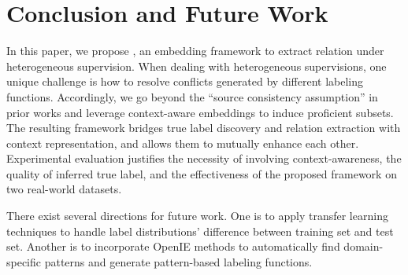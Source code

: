 \section{Conclusion and Future Work}
\label{sect:conclusion}



In this paper, we propose \our, an embedding framework to extract relation under heterogeneous supervision. 
When dealing with heterogeneous supervisions, one unique challenge is how to resolve conflicts generated by different labeling functions. 
Accordingly, we go beyond the ``source consistency assumption'' in prior works and leverage context-aware embeddings to induce proficient subsets.
The resulting framework bridges true label discovery and relation extraction with context representation, and allows them to mutually enhance each other. 
Experimental evaluation justifies the necessity of involving context-awareness, the quality of inferred true label, and the effectiveness of the proposed framework on two real-world datasets.

There exist several directions for future work. 
One is to apply transfer learning techniques to handle label distributions' difference between training set and test set. 
Another is to incorporate OpenIE methods to automatically find domain-specific patterns and generate pattern-based labeling functions.